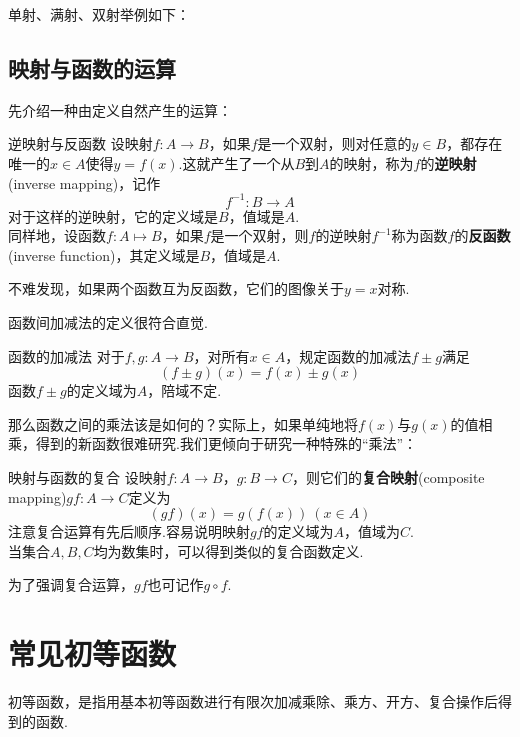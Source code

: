 \documentclass[lang=cn, zihao=4.5]{elegantbook}
\begin{document}
单射、满射、双射举例如下：


\subsection{映射与函数的运算}

先介绍一种由定义自然产生的运算：

\begin{definition}{逆映射与反函数} %
    设映射$f:A \to B$，如果$f$是一个双射，则对任意的$y \in B$，都存在唯一的$x \in A$使得$y=f(x)$.这就产生了一个从$B$到$A$的映射，称为$f$的\textbf{逆映射}(inverse mapping)，记作$$f^{-1}:B \to A$$
    对于这样的逆映射，它的定义域是$B$，值域是$A$.\\
    同样地，设函数$f:A \mapsto B$，如果$f$是一个双射，则$f$的逆映射$f^{-1}$称为函数$f$的\textbf{反函数}(inverse function)，其定义域是$B$，值域是$A$.
\end{definition}

不难发现，如果两个函数互为反函数，它们的图像关于$y=x$对称.

函数间加减法的定义很符合直觉.

\begin{definition}{函数的加减法}
	对于$f,g:A \to B$，对所有$x \in A$，规定函数的加减法$f \pm g$满足$$(f \pm g)(x) = f(x) \pm g(x)$$
	函数$f \pm g$的定义域为$A$，陪域不定.
\end{definition}

那么函数之间的乘法该是如何的？实际上，如果单纯地将$f(x)$与$g(x)$的值相乘，得到的新函数很难研究.我们更倾向于研究一种特殊的“乘法”：

\begin{definition}{映射与函数的复合} %
    设映射$f:A \to B$，$g:B \to C$，则它们的\textbf{复合映射}(composite mapping)$gf:A \to C$定义为$$(gf)(x)=g(f(x)) \ (x \in A)$$
    注意复合运算有先后顺序.容易说明映射$gf$的定义域为$A$，值域为$C$.\\
    当集合$A,B,C$均为数集时，可以得到类似的复合函数定义.
\end{definition}
\begin{remark}
	为了强调复合运算，$gf$也可记作$g \circ f$.
\end{remark}

\section{常见初等函数}

初等函数，是指用基本初等函数进行有限次加减乘除、乘方、开方、复合操作后得到的函数.
\end{document}
